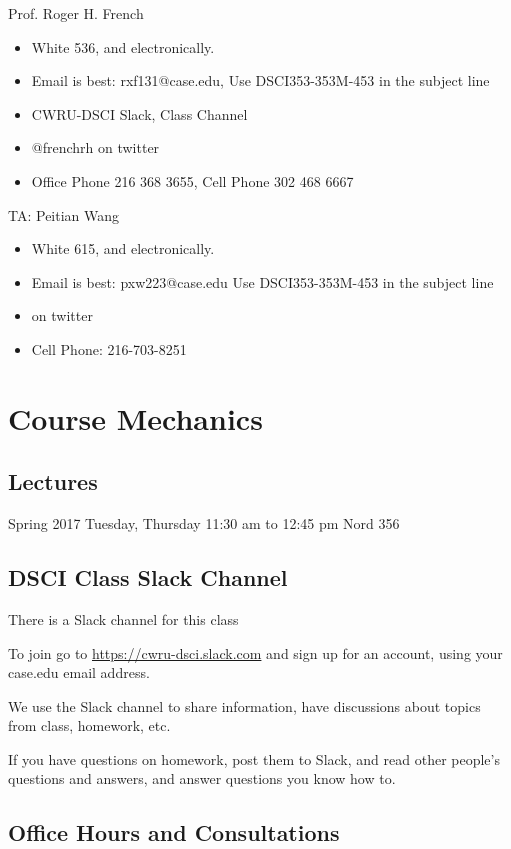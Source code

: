 \documentclass[11pt]{article} %
\begin{document}
  Prof. Roger H. French
  \begin{itemize}
  	\item White 536, and electronically.
  	\item Email is best: rxf131@case.edu, Use DSCI353-353M-453 in the subject line
    \item CWRU-DSCI Slack, Class Channel
  	\item @frenchrh on twitter
  	\item Office Phone 216 368 3655, Cell Phone 302 468 6667
  \end{itemize}
  TA: Peitian Wang
  \begin{itemize}
  	\item White 615, and electronically.
  	\item Email is best: pxw223@case.edu 
    \subitem Use DSCI353-353M-453 in the subject line
  	\item  on twitter
  	\item Cell Phone: 216-703-8251 
  \end{itemize}

\section{Course Mechanics}

  \subsection{Lectures}
    Spring 2017 	Tuesday, Thursday 11:30 am to 12:45 pm		Nord 356
  
  \subsection{DSCI Class Slack Channel}
  
    There is a Slack channel for this class
    
    To join go to \href{"https://cwru-dsci.slack.com''}{https://cwru-dsci.slack.com} and sign up for an account, using your case.edu email address. 
    
    We use the Slack channel to share information, have discussions about topics from class, homework, etc.  
    
    If you have questions on homework, post them to Slack, and read other people's questions and answers, and answer questions you know how to. 
  
  \subsection{Office Hours and Consultations}
    
\end{document}
